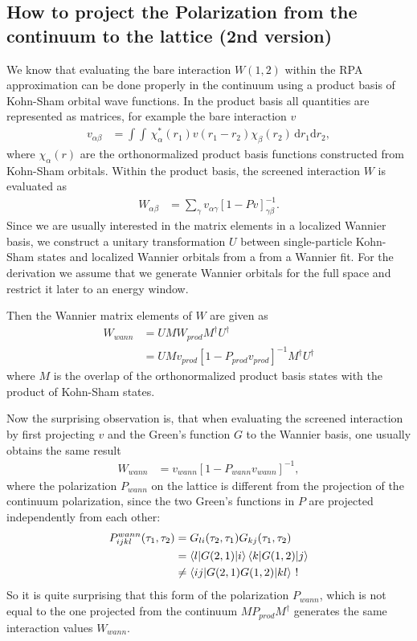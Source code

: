 \documentclass[12pt,a4paper]{scrartcl}
\numberwithin{equation}{section}
\begin{document}

\subsection{How to project the Polarization from the continuum to the lattice (2nd version)}

We know that evaluating the bare interaction $W(1,2)$ within the RPA approximation
can be done properly in the continuum using a product basis of Kohn-Sham orbital wave functions.
In the product basis all quantities are represented as matrices, for example the bare interaction $v$
\begin{align}
v_{\alpha\beta} &= \int\int \, \chi^*_{\alpha}(r_1) v(r_1-r_2)\chi_{\beta}(r_2) \, \mathrm{d}r_1 \mathrm{d}r_2,
\end{align}
where $\chi_{\alpha}(r)$ are the orthonormalized product basis functions constructed from
Kohn-Sham orbitals. Within the product basis, the screened interaction $W$ is evaluated as
\begin{align}
 W_{\alpha\beta}
 &=  \sum_{\gamma} v_{\alpha \gamma} \left[ 1 - Pv \right]^{-1}_{\gamma \beta}.
\end{align}
Since we are usually interested in the matrix elements in a localized Wannier basis, 
we construct a unitary transformation $U$ between single-particle Kohn-Sham states and localized Wannier orbitals
from a from a Wannier fit.
For the derivation we assume that we generate Wannier orbitals for the full space and restrict it later to 
an energy window.

Then the Wannier matrix elements of $W$ are given as
\begin{align}
 W_{wann} &=  U M W_{prod} M^{\dagger} U^{\dagger} \\
 &=  U M v_{prod} \left[ 1 - P_{prod}v_{prod} \right]^{-1} M^{\dagger} U^{\dagger} 
\end{align}
where $M$ is the overlap of the orthonormalized product basis states with the product of Kohn-Sham states.

Now the surprising observation is, that when evaluating the screened interaction by first projecting $v$
and the Green's function $G$ to the Wannier basis, one usually obtains the same result
\begin{align}
 W_{wann} 
 &=  v_{wann} \left[ 1 - P_{wann}v_{wann} \right]^{-1},
\end{align}
where the polarization $P_{wann}$ on the lattice is different from the projection of the continuum polarization,
since the two Green's functions in $P$ are projected independently from each other:
\begin{align}
 P^{wann}_{ijkl}(\tau_1,\tau_2) &= G_{li}(\tau_2,\tau_1) G_{kj}(\tau_1,\tau_2) \\
 &= \braket{l|G(2,1)|i} \braket{k|G(1,2)|j} \\
 &\neq \braket{ij|G(2,1)G(1,2)|kl} \ !
\end{align}
So it is quite surprising that this form of the polarization $P_{wann}$, which is
not equal to the one projected from the continuum $M P_{prod} M^{\dagger}$ generates the same interaction
values $W_{wann}$.
\end{document}
